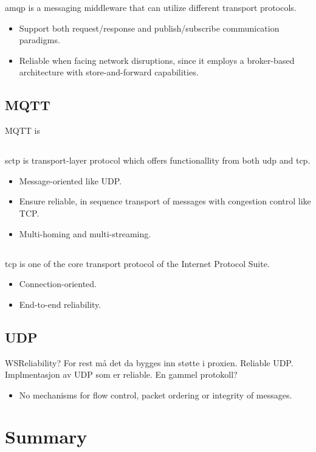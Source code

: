 \gls{amqp} is a messaging middleware that can utilize different transport
protocols.

\begin{itemize}
    \item Support both request/response and publish/subscribe communication
    paradigms.
    \item Reliable when facing network disruptions, since it employs a
    broker-based architecture with store-and-forward capabilities.
\end{itemize}

\subsection{MQTT}
MQTT is

\subsection{}

\gls{sctp} is transport-layer protocol which offers functionallity from both \gls{udp} and \gls{tcp}.
\begin{itemize}
    \item Message-oriented like UDP.
    \item Ensure reliable, in sequence transport of messages with congestion control like TCP.
    \item Multi-homing and multi-streaming.
\end{itemize}


\subsection{}
\gls{tcp} is one of the core transport protocol of the Internet Protocol Suite.
\begin{itemize}
    \item Connection-oriented.
    \item End-to-end reliability.
\end{itemize}

\subsection{UDP}
WSReliability? For rest må det da bygges inn støtte i proxien.
Reliable UDP. Implmentasjon av UDP som er reliable. En gammel protokoll?
\begin{itemize}
    \item No mechanisms for flow control, packet ordering or integrity of
    messages.
\end{itemize}


\section{Summary}
